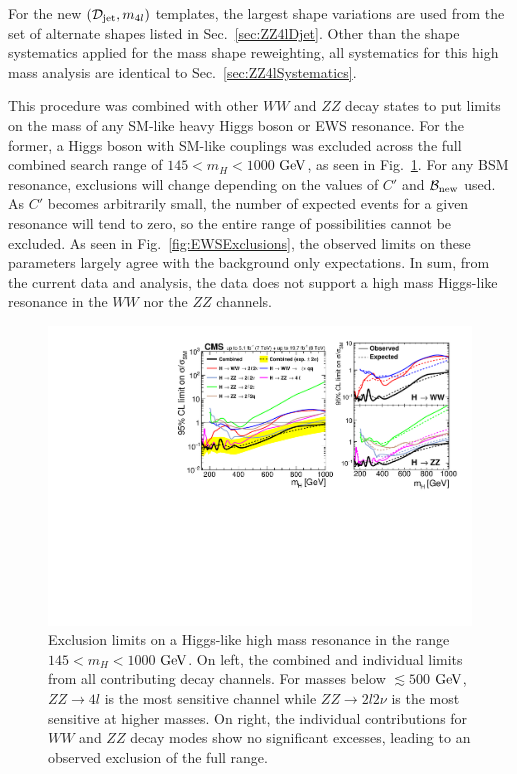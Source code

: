 For the new $(\mathcal{D}_{\rm{jet}},m_{4l})$ templates, the largest shape variations are used from the set of alternate shapes listed in Sec.~\ref{sec:ZZ4lDjet}. Other than the shape systematics applied for the mass shape reweighting, all systematics for this high mass analysis are identical to Sec.~\ref{sec:ZZ4lSystematics}. 

This procedure was combined with other $WW$ and $ZZ$ decay states to put limits on the mass of any SM-like heavy Higgs boson or EWS resonance. For the former, a Higgs boson with SM-like couplings was excluded across the full combined search range of $145 < m_{H} < 1000$ $\rm{GeV}$, as seen in Fig.~\ref{fig:HMExclusion}. For any BSM resonance, exclusions will change depending on the values of $C'$ and $\mathcal{B}_{\rm{new}}$ used. As $C'$ becomes arbitrarily small, the number of expected events for a given resonance will tend to zero, so the entire range of possibilities cannot be excluded. As seen in Fig.~\ref{fig:EWSExclusions}, the observed limits on these parameters largely agree with the background only expectations. In sum, from the current data and analysis, the data does not support a high mass Higgs-like resonance in the $WW$ nor the $ZZ$ channels.

\begin{figure}[htbp]
\begin{center}
\includegraphics[width=.75\linewidth]{HiggsProperties/figures/combinedSM_def.pdf}
\caption[Combined Expected and Observed Exclusion Limits for High Mass Higgs Search]{Exclusion limits on a Higgs-like high mass resonance in the range $145 < m_{H} < 1000$ $\rm{GeV}$. On left, the combined and individual limits from all contributing decay channels. For masses below $\lesssim 500$ $\rm{GeV}$, $ZZ\rightarrow 4l$ is the most sensitive channel while $ZZ\rightarrow 2l2\nu$ is the most sensitive at higher masses. On right, the individual contributions for $WW$ and $ZZ$ decay modes show no significant excesses, leading to an observed exclusion of the full range.}
\label{fig:HMExclusion}
\end{center}
\end{figure}

